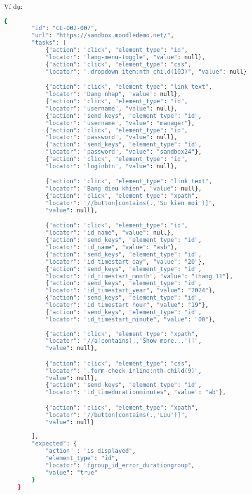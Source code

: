 Ví dụ:
\begin{lstlisting}[language=bash, caption={Ví dụ testcase CE-002-007 ở level 2}]
    {
        "id": "CE-002-007",
        "url": "https://sandbox.moodledemo.net/",
        "tasks": [
            {"action": "click", "element_type": "id", 
            "locator": "lang-menu-toggle", "value": null},
            {"action": "click", "element_type": "css", 
            "locator": ".dropdown-item:nth-child(103)", "value": null},

            {"action": "click", "element_type": "link text", 
            "locator": "Dang nhap", "value": null},
            {"action": "click", "element_type": "id", 
            "locator": "username", "value": null},
            {"action": "send_keys", "element_type": "id", 
            "locator": "username", "value": "manager"},
            {"action": "click", "element_type": "id", 
            "locator": "password", "value": null},
            {"action": "send_keys", "element_type": "id", 
            "locator": "password", "value": "sandbox24"},
            {"action": "click", "element_type": "id", 
            "locator": "loginbtn", "value": null},

            {"action": "click", "element_type": "link text", 
            "locator": "Bang dieu khien", "value": null},
            {"action": "click", "element_type": "xpath", 
            "locator": "//button[contains(.,'Su kien moi')]", 
            "value": null},

            {"action": "click", "element_type": "id", 
            "locator": "id_name", "value": null},
            {"action": "send_keys", "element_type": "id", 
            "locator": "id_name", "value": "asb"},
            {"action": "send_keys", "element_type": "id", 
            "locator": "id_timestart_day", "value": "20"},
            {"action": "send_keys", "element_type": "id", 
            "locator": "id_timestart_month", "value": "thang 11"},
            {"action": "send_keys", "element_type": "id", 
            "locator": "id_timestart_year", "value": "2024"},
            {"action": "send_keys", "element_type": "id", 
            "locator": "id_timestart_hour", "value": "19"},
            {"action": "send_keys", "element_type": "id", 
            "locator": "id_timestart_minute", "value": "00"},
            
            {"action": "click", "element_type": "xpath", 
            "locator": "//a[contains(.,'Show more...')]", 
            "value": null},

            {"action": "click", "element_type": "css", 
            "locator": ".form-check-inline:nth-child(9)", 
            "value": null},
            {"action": "send_keys", "element_type": "id", 
            "locator": "id_timedurationminutes", "value": "ab"},

            {"action": "click", "element_type": "xpath", 
            "locator": "//button[contains(.,'Luu')]", 
            "value": null}
            
        ],
        "expected": {
            "action" : "is_displayed",
            "element_type": "id",
            "locator": "fgroup_id_error_durationgroup",
            "value": "true"
        }
    }
\end{lstlisting}

